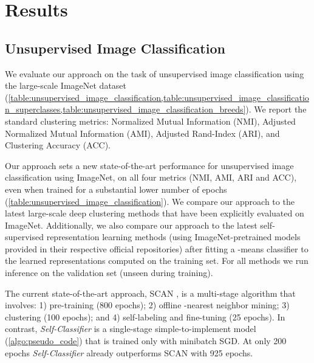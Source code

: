 \documentclass[runningheads]{llncs}
\begin{document}
\section{Results}
\label{section:experiments} 
\subsection{Unsupervised Image Classification}
\label{section:unsupervised_image_classification}
We evaluate our approach on the task of unsupervised image classification using the large-scale ImageNet dataset (\cref{table:unsupervised_image_classification,table:unsupervised_image_classification_superclasses,table:unsupervised_image_classification_breeds}). We report the standard clustering metrics: Normalized Mutual Information (NMI), Adjusted Normalized Mutual Information (AMI), Adjusted Rand-Index (ARI), and Clustering Accuracy (ACC).  

Our approach sets a new state-of-the-art performance for unsupervised image classification using ImageNet, on all four metrics (NMI, AMI, ARI and ACC), even when trained for a substantial lower number of epochs (\cref{table:unsupervised_image_classification}). We compare our approach to the latest large-scale deep clustering methods \cite{YM.2020Self-labelling,van2020scan} that have been explicitly evaluated on ImageNet. Additionally, we also compare our approach to the latest self-supervised representation learning methods (using ImageNet-pretrained models provided in their respective official repositories) after fitting a -means classifier to the learned representations computed on the training set. For all methods we run inference on the validation set (unseen during training). 

The current state-of-the-art approach, SCAN \cite{van2020scan}, is a multi-stage algorithm that involves: 1) pre-training (800 epochs); 2) offline -nearest neighbor mining; 3) clustering (100 epochs); and 4) self-labeling and fine-tuning (25 epochs). In contrast, \textit{Self-Classifier} is a single-stage simple-to-implement model (\cref{algo:pseudo_code}) that is trained only with minibatch SGD. At only 200 epochs \textit{Self-Classifier} already outperforms SCAN with 925 epochs.
\end{document}
